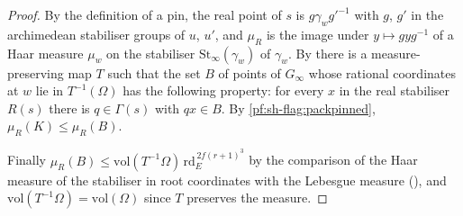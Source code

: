 \begin{proof}
By the definition of a pin, the real point of $s$ is $g\gamma_wg'^{-1}$ with $g$, $g'$ in the archimedean stabiliser groups of $u$, $u'$,
and $\mu_R$ is the image under $y\mapsto gyg^{-1}$ of a Haar measure $\mu_w$ on the stabiliser $\mathrm{St}_\infty(\gamma_w)$ of $\gamma_w$. By
 there is a measure-preserving map $T$ such that the set
$B$ of points of $G_\infty$ whose rational coordinates at $w$ lie in $T^{-1}(\Omega)$ has the following property: for every $x$ in the real
stabiliser $R(s)$ there is $q\in\Gamma(s)$ with $qx\in B$. By \cref{pf:sh-flag:packpinned}, $\mu_R(K)\le\mu_R(B)$.

Finally $\mu_R(B)\le\mathrm{vol}(T^{-1}\Omega)\,\mathrm{rd}_E^{\,2f(r+1)^3}$ by the comparison of the Haar measure of the stabiliser in root
coordinates with the Lebesgue measure (), and
$\mathrm{vol}(T^{-1}\Omega)=\mathrm{vol}(\Omega)$ since $T$ preserves the measure.
\end{proof}

